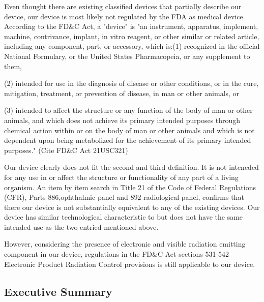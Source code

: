 \documentclass{article}
\begin{document}
Even thought there are existing classified devices that partially
describe our device, our device is most likely not regulated by the
FDA as medical device. According to the FD\&C Act, a "device" is "an
instrument, apparatus, implement, machine, contrivance, implant, in
vitro reagent, or other similar or related article, including any
component, part, or accessory, which is:(1) recognized in the official
National Formulary, or the United States Pharmacopeia, or any
supplement to them,

(2) intended for use in the diagnosis of disease or other conditions,
or in the cure, mitigation, treatment, or prevention of disease, in
man or other animals, or

(3) intended to affect the structure or any function of the body of
man or other animals, and which does not achieve its primary intended
purposes through chemical action within or on the body of man or other
animals and which is not dependent upon being metabolized for the
achievement of its primary intended purposes." (Cite FD\&C Act
21USC321)

Our device clearly does not fit the second and third definition. It is
not inteneded for any use in or affect the structure or functionality
of any part of a living organism. An item by item search in Title 21
of the Code of Federal Regulations (CFR), Parts 886,ophthalmic panel
and 892 radiological panel, confirms that there our device is not
substantially equivalent to any of the existing devices. Our device
has similar technological characteristic to but does not have the same
intended use as the two entried mentioned above.

However, considering the presence of electronic and visible radiation
emitting component in our device, regulations in the FD\&C Act
sections 531-542 Electronic Product Radiation Control provisions is
still applicable to our device.











\setcounter{subsection}{0}
\subsection{Executive Summary}
\end{document}
